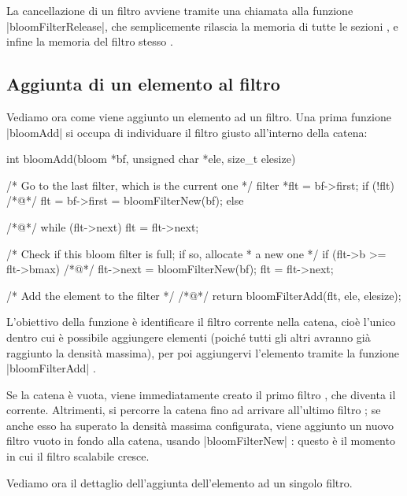La cancellazione di un filtro avviene tramite una chiamata alla funzione \cverb|bloomFilterRelease|,
che semplicemente rilascia la memoria di tutte le sezioni , e infine la memoria del filtro
stesso .

\subsection{Aggiunta di un elemento al filtro}

Vediamo ora come viene aggiunto un elemento ad un filtro. Una prima funzione \cverb|bloomAdd| si
occupa di individuare il filtro giusto all'interno della catena:

\begin{commentedsource}[style=csource,caption=Aggiunta elemento ad un filtro scalabile]
int bloomAdd(bloom *bf, unsigned char *ele, size_t elesize) {
    /* Go to the last filter, which is the current one */
    filter *flt = bf->first;
    if (!flt)
/*@\lnote@*/        flt = bf->first = bloomFilterNew(bf);
    else {
/*@\lnote@*/        while (flt->next)
            flt = flt->next;

        /* Check if this bloom filter is full; if so, allocate
         * a new one */
        if (flt->b >= flt->bmax) {
/*@\lnote@*/            flt->next = bloomFilterNew(bf);
            flt = flt->next;
        }
    }

    /* Add the element to the filter */
/*@\lnote@*/    return bloomFilterAdd(flt, ele, elesize);
}
\end{commentedsource}

L'obiettivo della funzione è identificare il filtro corrente nella catena, cioè l'unico dentro cui è
possibile aggiungere elementi (poiché tutti gli altri avranno già raggiunto la densità massima), per
poi aggiungervi l'elemento tramite la funzione \cverb|bloomFilterAdd| .

Se la catena è vuota, viene immediatamente creato il primo filtro , che diventa il
corrente. Altrimenti, si percorre la catena fino ad arrivare all'ultimo filtro ; se anche
esso ha superato la densità massima configurata, viene aggiunto un nuovo filtro vuoto in fondo alla
catena, usando \cverb|bloomFilterNew| : questo è il momento in cui il filtro scalabile
cresce.

Vediamo ora il dettaglio dell'aggiunta dell'elemento ad un singolo filtro.


